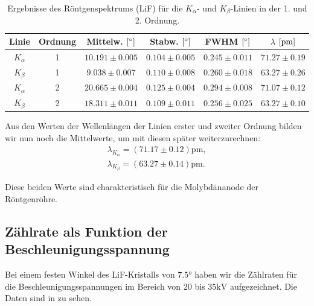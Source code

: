 \begin{table}[H]
  \centering
  \caption{Ergebnisse des Röntgenspektrums (LiF) für die $K_{\alpha}$- und $K_{\beta}$-Linien in der 1. und 2. Ordnung.}
  \vspace*{0.5em}
  \begin{tabular}{c|c|c|c|c||c}
    Linie & Ordnung & Mittelw. $\qty[\si{\degree}]$ & Stabw. $\qty[\si{\degree}]$ & FWHM $\qty[\si{\degree}]$ & $\lambda$ $\qty[\si{\pico\meter}]$\\\hline
    $K_{\alpha}$ & 1 & $10.191 \pm 0.005$ & $0.104 \pm 0.005$ & $0.245 \pm 0.011$ & $71.27 \pm 0.19$ \\
    $K_{\beta}$  & 1 & $9.038 \pm 0.007$  & $0.110 \pm 0.008$ & $0.260 \pm 0.018$ & $63.27 \pm 0.26$ \\\hline
    $K_{\alpha}$ & 2 & $20.665 \pm 0.004$ & $0.125 \pm 0.004$ & $0.294 \pm 0.008$ & $71.07 \pm 0.12$ \\
    $K_{\beta}$  & 2 & $18.311 \pm 0.011$ & $0.109 \pm 0.011$ & $0.256 \pm 0.025$ & $63.27 \pm 0.10$ \\\hline
  \end{tabular}
  \label{tab:lif_k_alpha_beta}
\end{table}

Aus den Werten der Wellenlängen der Linien erster und zweiter Ordnung bilden wir nun noch die Mittelwerte, um mit diesen später weiterzurechnen:
\begin{align}
  \lambda_{K_{\alpha}} = (71.17 \pm 0.12)\si{\pico\meter},\label{res:wl_kalp}\\[1em]
  \lambda_{K_{\beta}} = (63.27 \pm 0.14)\si{\pico\meter}.\label{res:wl_kbet}
\end{align}

Diese beiden Werte sind charakteristisch für die Molybdänanode der Röntgenröhre.

\subsection{Zählrate als Funktion der Beschleunigungsspannung}

Bei einem festen Winkel des LiF-Kristalls von $7.5\si{\degree}$ haben wir die Zählraten für die Beschleunigungsspannungen im Bereich von $20$ bis $35\si{\kilo\volt}$ aufgezeichnet. Die Daten sind in  zu sehen.

